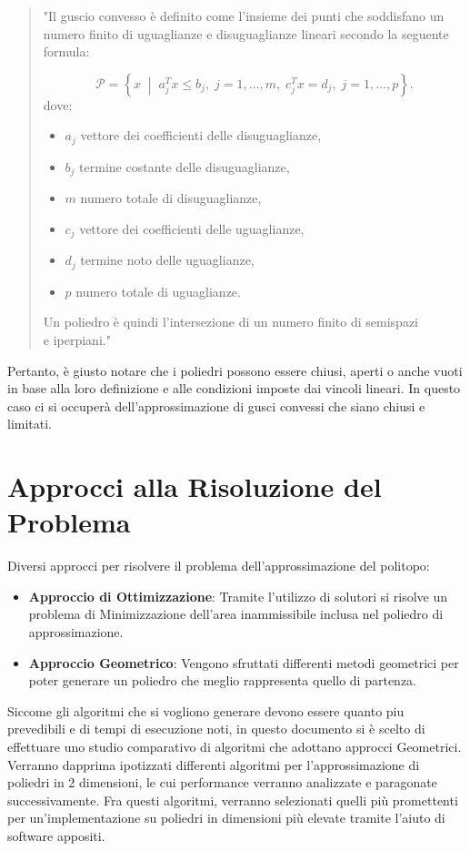 \begin{quote}
"Il guscio convesso è definito come l'insieme dei punti che soddisfano un numero 
finito di uguaglianze e disuguaglianze lineari secondo la seguente formula:

\[
\mathcal{P} = \left\{ x \; \middle| \; a_j^T x \leq b_j, \; j = 1, \ldots, m, \; c_j^T x = d_j, \; j = 1, \ldots, p \right\}.
\]
dove:
\begin{itemize}
    \item \( a_j \) vettore dei coefficienti delle disuguaglianze,
    \item \( b_j \) termine costante delle disuguaglianze,
    \item \( m \) numero totale di disuguaglianze,
    \item \( c_j \) vettore dei coefficienti delle uguaglianze,
    \item \( d_j \) termine noto delle uguaglianze,
    \item \( p \) numero totale di uguaglianze.
\end{itemize}
Un poliedro è quindi l'intersezione di un numero finito di semispazi \\
e iperpiani."
\end{quote}

Pertanto, è giusto notare che i poliedri possono essere chiusi,
aperti o anche vuoti in base alla loro definizione e alle condizioni 
imposte dai vincoli lineari. In questo caso ci si occuperà dell'approssimazione
di gusci convessi che siano chiusi e limitati.


\section{Approcci alla Risoluzione del Problema}

Diversi approcci per risolvere il problema dell'approssimazione del politopo:

\begin{itemize}
    \item \textbf{Approccio di Ottimizzazione}: 
    Tramite l'utilizzo di solutori si risolve un problema di Minimizzazione dell'area 
    inammissibile inclusa nel poliedro di approssimazione.
    \item \textbf{Approccio Geometrico}: 
    Vengono sfruttati differenti metodi geometrici per poter generare un 
    poliedro che meglio rappresenta quello di partenza.
\end{itemize}

Siccome gli algoritmi che si vogliono generare devono essere quanto 
piu prevedibili e di tempi di esecuzione noti, in questo documento si è scelto 
di effettuare uno studio comparativo di algoritmi che adottano approcci Geometrici.
Verranno dapprima ipotizzati differenti algoritmi per l'approssimazione 
di poliedri in 2 dimensioni, le cui performance verranno analizzate e paragonate successivamente.
Fra questi algoritmi, verranno selezionati quelli più promettenti per un'implementazione 
su poliedri in dimensioni più elevate tramite l'aiuto di software appositi. 


